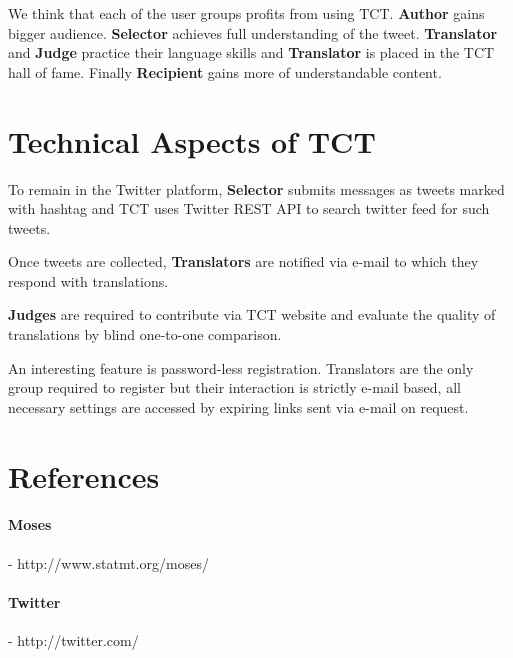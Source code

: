 \documentclass[11pt]{article}
\begin{document}
We think that each of the user groups profits from using TCT. 
\textbf{Author} gains bigger audience. 
\textbf{Selector} achieves full understanding of the tweet.
\textbf{Translator} and \textbf{Judge} practice their language skills 
and \textbf{Translator} is placed in the TCT hall of fame.
Finally \textbf{Recipient} gains more of understandable content.

\section{Technical Aspects of TCT}
\label{implementation}
To remain in the Twitter platform,
\textbf{Selector} submits messages as tweets marked with hashtag 
 and TCT uses Twitter REST API to search twitter feed
for such tweets.

Once tweets are collected, \textbf{Translators} are notified via e-mail
to which they respond with translations. %

\textbf{Judges} are %
required to contribute via 
TCT website and evaluate the quality of translations by blind one-to-one 
comparison. 

An interesting feature is password-less registration. 
Translators are the only group required to register but their interaction
is strictly e-mail based, all necessary settings are accessed by expiring links sent via e-mail on request. 

\section*{References}

% 
%  

\paragraph{Moses} - http://www.statmt.org/moses/
\paragraph{Twitter} - http://twitter.com/
\end{document}
